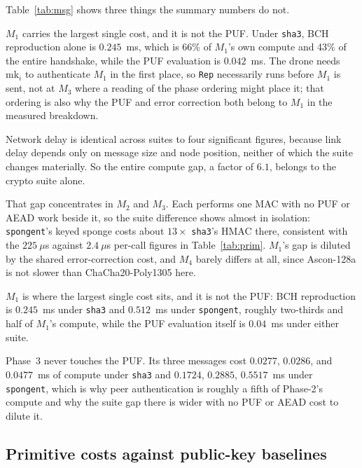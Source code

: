\documentclass[conference]{IEEEtran}
\begin{document}
Table~\ref{tab:msg} shows three things the summary numbers do not.

$M_1$ carries the largest single cost, and it is not the PUF. Under
\texttt{sha3}, BCH reproduction alone is $0.245$~ms, which is 66\% of $M_1$'s own
compute and 43\% of the entire handshake, while the PUF evaluation is $0.042$~ms.
The drone needs $\text{mk}_i$ to authenticate $M_1$ in the first place, so
\texttt{Rep} necessarily runs before $M_1$ is sent, not at $M_3$ where a reading
of the phase ordering might place it; that ordering is also why the PUF and error
correction both belong to $M_1$ in the measured breakdown.

Network delay is identical across suites to four significant figures, because
link delay depends only on message size and node position, neither of which the
suite changes materially. So the entire compute gap, a factor of $6.1$, belongs
to the crypto suite alone.

That gap concentrates in $M_2$ and $M_3$. Each performs one MAC with no PUF or
AEAD work beside it, so the suite difference shows almost in isolation:
\texttt{spongent}'s keyed sponge costs about $13\times$ \texttt{sha3}'s HMAC
there, consistent with the $225~\mu$s against $2.4~\mu$s per-call figures in
Table~\ref{tab:prim}. $M_1$'s gap is diluted by the shared error-correction cost,
and $M_4$ barely differs at all, since Ascon-128a is not slower than
ChaCha20-Poly1305 here.

$M_1$ is where the largest single cost sits, and it is not the PUF: BCH
reproduction is $0.245$~ms under \texttt{sha3} and $0.512$~ms under
\texttt{spongent}, roughly two-thirds and half of $M_1$'s compute, while the PUF
evaluation itself is $0.04$~ms under either suite.

Phase~3 never touches the PUF. Its three messages cost $0.0277$, $0.0286$, and
$0.0477$~ms of compute under \texttt{sha3} and $0.1724$, $0.2885$, $0.5517$~ms
under \texttt{spongent}, which is why peer authentication is roughly a fifth
of Phase-2's compute and why the suite gap there is wider with no PUF or AEAD
cost to dilute it.

\subsection{Primitive costs against public-key baselines}
\end{document}

